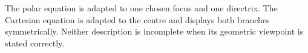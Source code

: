 \begin{corebox}
The polar equation is adapted to one chosen focus and one directrix. The
Cartesian equation is adapted to the centre and displays both branches
symmetrically. Neither description is incomplete when its geometric viewpoint
is stated correctly.
\end{corebox}
